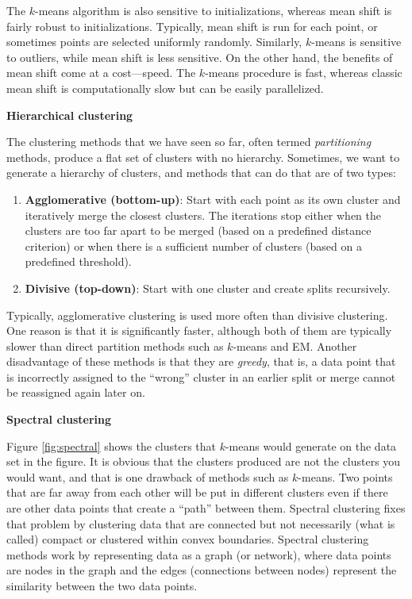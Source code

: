 \documentclass[]{krantz}
\begin{document}
The \(k\)-means algorithm is also sensitive to initializations, whereas
mean shift is fairly robust to initializations. Typically, mean shift is
run for each point, or sometimes points are selected uniformly randomly.
Similarly, \(k\)-means is sensitive to outliers, while mean shift is
less sensitive. On the other hand, the benefits of mean shift come at a
cost---speed. The \(k\)-means procedure is fast, whereas classic mean
shift is computationally slow but can be easily parallelized.

\textbf{Hierarchical clustering}

The clustering methods that we have seen so far, often termed
\emph{partitioning} methods, produce a flat set of clusters with no
hierarchy. Sometimes, we want to generate a hierarchy of clusters, and
methods that can do that are of two types:

\begin{enumerate}
\def\labelenumi{\arabic{enumi}.}
\item
  \textbf{Agglomerative (bottom-up)}: Start with each point as its own
  cluster and iteratively merge the closest clusters. The iterations
  stop either when the clusters are too far apart to be merged (based on
  a predefined distance criterion) or when there is a sufficient number
  of clusters (based on a predefined threshold).
\item
  \textbf{Divisive (top-down)}: Start with one cluster and create splits
  recursively.
\end{enumerate}

Typically, agglomerative clustering is used more often than divisive
clustering. One reason is that it is significantly faster, although both
of them are typically slower than direct partition methods such as
\(k\)-means and EM. Another disadvantage of these methods is that they
are \emph{greedy}, that is, a data point that is incorrectly assigned to
the ``wrong'' cluster in an earlier split or merge cannot be reassigned
again later on.

\textbf{Spectral clustering}

Figure \ref{fig:spectral} shows the clusters that \(k\)-means would
generate on the data set in the figure. It is obvious that the clusters
produced are not the clusters you would want, and that is one drawback
of methods such as \(k\)-means. Two points that are far away from each
other will be put in different clusters even if there are other data
points that create a ``path'' between them. Spectral clustering fixes
that problem by clustering data that are connected but not necessarily
(what is called) compact or clustered within convex boundaries. Spectral
clustering methods work by representing data as a graph (or network),
where data points are nodes in the graph and the edges (connections
between nodes) represent the similarity between the two data points.
\end{document}
